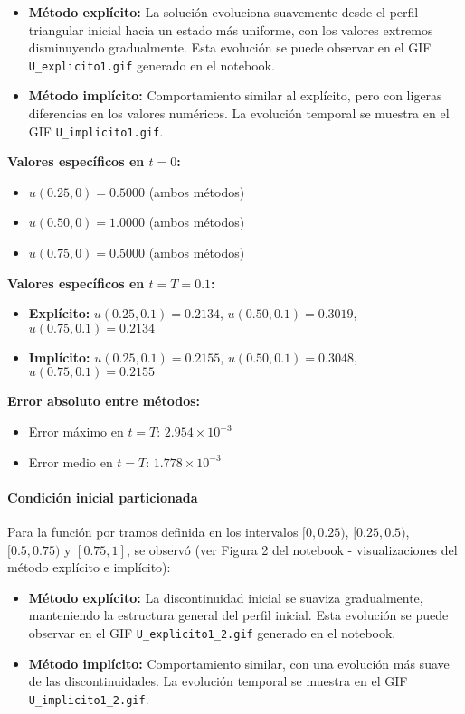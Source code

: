 \documentclass[12pt,a4paper]{article}
\begin{document}
\begin{itemize}
    \item \textbf{Método explícito:} La solución evoluciona suavemente desde el perfil triangular inicial hacia un estado más uniforme, con los valores extremos disminuyendo gradualmente. Esta evolución se puede observar en el GIF \texttt{U\_explicito1.gif} generado en el notebook.
    \item \textbf{Método implícito:} Comportamiento similar al explícito, pero con ligeras diferencias en los valores numéricos. La evolución temporal se muestra en el GIF \texttt{U\_implicito1.gif}.
\end{itemize}

\textbf{Valores específicos en $t = 0$:}
\begin{itemize}
    \item $u(0.25, 0) = 0.5000$ (ambos métodos)
    \item $u(0.50, 0) = 1.0000$ (ambos métodos) 
    \item $u(0.75, 0) = 0.5000$ (ambos métodos)
\end{itemize}

\textbf{Valores específicos en $t = T = 0.1$:}
\begin{itemize}
    \item \textbf{Explícito:} $u(0.25, 0.1) = 0.2134$, $u(0.50, 0.1) = 0.3019$, $u(0.75, 0.1) = 0.2134$
    \item \textbf{Implícito:} $u(0.25, 0.1) = 0.2155$, $u(0.50, 0.1) = 0.3048$, $u(0.75, 0.1) = 0.2155$
\end{itemize}

\textbf{Error absoluto entre métodos:}
\begin{itemize}
    \item Error máximo en $t = T$: $2.954 \times 10^{-3}$
    \item Error medio en $t = T$: $1.778 \times 10^{-3}$
\end{itemize}

\paragraph{Condición inicial particionada}

Para la función por tramos definida en los intervalos $[0, 0.25)$, $[0.25, 0.5)$, $[0.5, 0.75)$ y $[0.75, 1]$, se observó (ver Figura 2 del notebook - visualizaciones del método explícito e implícito):

\begin{itemize}
    \item \textbf{Método explícito:} La discontinuidad inicial se suaviza gradualmente, manteniendo la estructura general del perfil inicial. Esta evolución se puede observar en el GIF \texttt{U\_explicito1\_2.gif} generado en el notebook.
    \item \textbf{Método implícito:} Comportamiento similar, con una evolución más suave de las discontinuidades. La evolución temporal se muestra en el GIF \texttt{U\_implicito1\_2.gif}.
\end{itemize}
\end{document}
